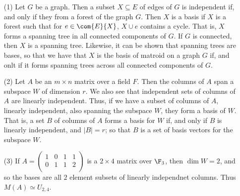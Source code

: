 \begin{example}\label{1.11}
    \begin{enumerate}
        \item[(1)] Let $G$ be a graph. Then a subset $X \subseteq E$ of edges
            of $G$ is independent if, and only if they from a forest of the
            graph $G$. Then $X$ is a basis if  $X$ is a forest such that for
            $e \in \com{E}{X}$, $X \cup e$ contains a cycle. That is, $X$ forms
            a spanning tree in all connected components of  $G$. If  $G$ is
            connected, then $X$ is a spanning tree. Likewise, it can be shown
            that spanning trees are bases, so that we have that  $X$ is the
            basis of matroid on a graph $G$ if, and onlt if it forms spanning
            trees across all connected components of $G$.

        \item [(2)] Let $A$ be an $m \times n$ matrix over a field $F$. Then the
            columns of  $A$ span a subspace  $W$ of dimension  $r$. We also see
            that independent sets of columns of $A$ are linearly independent.
            Thus, if we have a subset of columns of $A$, linearly independent,
            also spanning the subspace $W$, they form a basis of  $W$. That is,
            a set $B$ of columns of  $A$ forms a basis for  $W$ if, and only if
             $B$ is linearly independent, and $|B|=r$; so that $B$ is a set of
             basis vectors for the subspace $W$.

         \item[(3)] If $A=\begin{pmatrix}
                        1 & 0 & 1 & 1 \\
                        0 & 1 & 1 & 2 \\
                      \end{pmatrix}$
                is a $2 \times 4$ matrix over $\F_3$, then $\dim{W}=2$, and so
                the bases are all $2$ element subsets of linearly independnet
                columns. Thus  $M(A) \simeq U_{2,4}$.


\end{enumerate}
\end{example}
